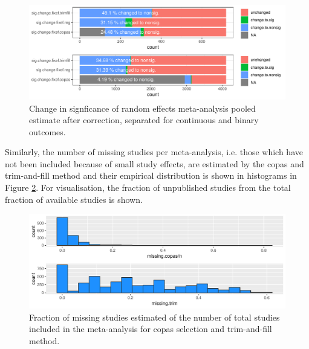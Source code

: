 \documentclass[11pt,a4paper,twoside]{book}\usepackage[]{graphicx}\usepackage[]{color}
\newenvironment{knitrout}{}{} %
\begin{document}
\begin{figure}
\begin{knitrout}
\color{fgcolor}

{\centering \includegraphics[width=\textwidth-3cm]{figure/ch02_figunnamed-chunk-31-1} 

}



\end{knitrout}
\caption{Change in signficance of random effects meta-analysis pooled estimate after correction, separated for continuous and binary outcomes.}
\label{significance.change.random}
\end{figure}

Similarly, the number of missing studies per meta-analysis, i.e. those which have not been included because of small study effects, are estimated by the copas and trim-and-fill method and their empirical distribution is shown in histograms in Figure \ref{missing.studies.distribution}. For visualisation, the fraction of unpublished studies from the total fraction of available studies is shown.

\begin{figure}
\begin{knitrout}
\color{fgcolor}

{\centering \includegraphics[width=\textwidth-3cm]{figure/ch02_figunnamed-chunk-32-1} 

}



\end{knitrout}
\caption{Fraction of missing studies estimated of the number of total studies included in the meta-analysis for copas selection and trim-and-fill method.}
\label{missing.studies.distribution}
\end{figure}
\end{document}
